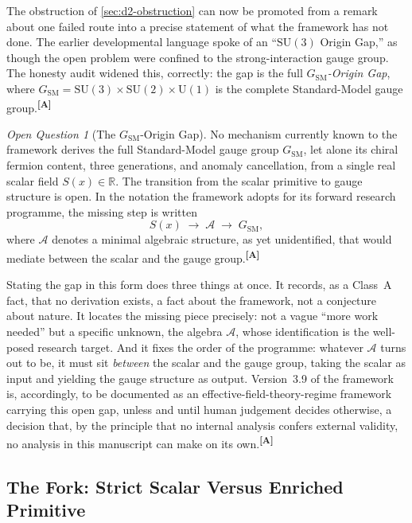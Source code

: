 \documentclass[12pt,a4paper,twoside]{article}
\theoremstyle{plain}
\theoremstyle{definition}
\theoremstyle{remark}
\newtheorem{openquestion}{Open Question}
\newcommand{\catmark}[1]{\textsuperscript{\textsf{\textbf{[#1]}}}}
\begin{document}
The obstruction of \cref{sec:d2-obstruction} can now be promoted from a remark about one failed route into a precise statement of what the framework has not done. The earlier developmental language spoke of an ``$\mathrm{SU}(3)$ Origin Gap,'' as though the open problem were confined to the strong-interaction gauge group. The honesty audit widened this, correctly: the gap is the full \emph{$G_{\mathrm{SM}}$-Origin Gap}, where $G_{\mathrm{SM}} = \mathrm{SU}(3)\times\mathrm{SU}(2)\times\mathrm{U}(1)$ is the complete Standard-Model gauge group.\catmark{A}

\begin{openquestion}[The $G_{\mathrm{SM}}$-Origin Gap]
\label{oq:gsm-gap}
No mechanism currently known to the framework derives the full Standard-Model gauge group $G_{\mathrm{SM}}$, let alone its chiral fermion content, three generations, and anomaly cancellation, from a single real scalar field $S(x)\in\mathbb{R}$. The transition from the scalar primitive to gauge structure is open. In the notation the framework adopts for its forward research programme, the missing step is written
\[
 S(x) \;\longrightarrow\; \mathcal{A} \;\longrightarrow\; G_{\mathrm{SM}},
\]
where $\mathcal{A}$ denotes a minimal algebraic structure, as yet unidentified, that would mediate between the scalar and the gauge group.\catmark{A}
\end{openquestion}

\noindent Stating the gap in this form does three things at once. It records, as a Class~A fact, that no derivation exists, a fact about the framework, not a conjecture about nature. It locates the missing piece precisely: not a vague ``more work needed'' but a specific unknown, the algebra $\mathcal{A}$, whose identification is the well-posed research target. And it fixes the order of the programme: whatever $\mathcal{A}$ turns out to be, it must sit \emph{between} the scalar and the gauge group, taking the scalar as input and yielding the gauge structure as output. Version~3.9 of the framework is, accordingly, to be documented as an effective-field-theory-regime framework carrying this open gap, unless and until human judgement decides otherwise, a decision that, by the principle that no internal analysis confers external validity, no analysis in this manuscript can make on its own.\catmark{A}

\subsection{The Fork: Strict Scalar Versus Enriched Primitive}
\label{subsec:the-fork}
\end{document}

